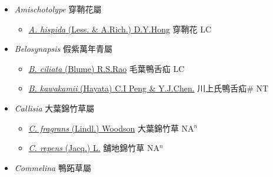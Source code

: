 
  \begin{itemize}
 \item[] \textit{Amischotolype} 穿鞘花屬
                    
  \begin{itemize}
        \item[] \href{http://www.theplantlist.org/tpl1.1/search?q=Amischotolype+hispida}{\textit{A. hispida} (Less. \& A.Rich.) D.Y.Hong}   穿鞘花 LC
  \end{itemize}
 \item[] \textit{Belosynapsis} 假紫萬年青屬
                    
  \begin{itemize}
        \item[] \href{http://www.theplantlist.org/tpl1.1/search?q=Belosynapsis+ciliata}{\textit{B. ciliata} (Blume) R.S.Rao}   毛葉鴨舌疝 LC
        \item[] \href{http://www.theplantlist.org/tpl1.1/search?q=Belosynapsis+kawakamii}{\textit{B. kawakamii} (Hayata) C.I Peng \& Y.J.Chen.}   川上氏鴨舌疝\# NT
  \end{itemize}
 \item[] \textit{Callisia} 大葉錦竹草屬
                    
  \begin{itemize}
        \item[] \href{http://www.theplantlist.org/tpl1.1/search?q=Callisia+fragrans}{\textit{C. fragrans} (Lindl.) Woodson}   大葉錦竹草 NA$^n$
        \item[] \href{http://www.theplantlist.org/tpl1.1/search?q=Callisia+repens}{\textit{C. repens} (Jacq.) L.}   舖地錦竹草 NA$^n$
  \end{itemize}
 \item[] \textit{Commelina} 鴨跖草屬
                    

\end{itemize}
